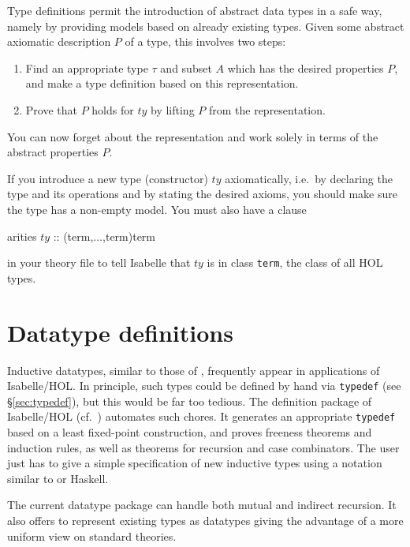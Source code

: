 Type definitions permit the introduction of abstract data types in a safe
way, namely by providing models based on already existing types.  Given some
abstract axiomatic description $P$ of a type, this involves two steps:
\begin{enumerate}
\item Find an appropriate type $\tau$ and subset $A$ which has the desired
  properties $P$, and make a type definition based on this representation.
\item Prove that $P$ holds for $ty$ by lifting $P$ from the representation.
\end{enumerate}
You can now forget about the representation and work solely in terms of the
abstract properties $P$.

\begin{warn}
If you introduce a new type (constructor) $ty$ axiomatically, i.e.\ by
declaring the type and its operations and by stating the desired axioms, you
should make sure the type has a non-empty model.  You must also have a clause
\par
\begin{ttbox}
arities \(ty\) :: (term,\thinspace\(\dots\),{\thinspace}term){\thinspace}term
\end{ttbox}
in your theory file to tell Isabelle that $ty$ is in class \texttt{term}, the
class of all HOL types.
\end{warn}


\section{Datatype definitions}
\label{sec:HOL:datatype}

Inductive datatypes, similar to those of \ML, frequently appear in
applications of Isabelle/HOL.  In principle, such types could be defined by
hand via \texttt{typedef} (see {\S}\ref{sec:typedef}), but this would be far too
tedious.  The  definition package of Isabelle/HOL (cf.\ 
\cite{Berghofer-Wenzel:1999:TPHOL}) automates such chores.  It generates an
appropriate \texttt{typedef} based on a least fixed-point construction, and
proves freeness theorems and induction rules, as well as theorems for
recursion and case combinators.  The user just has to give a simple
specification of new inductive types using a notation similar to {\ML} or
Haskell.

The current datatype package can handle both mutual and indirect recursion.
It also offers to represent existing types as datatypes giving the advantage
of a more uniform view on standard theories.


